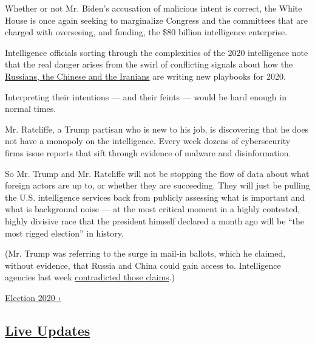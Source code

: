 Whether or not Mr. Biden's accusation of malicious intent is correct,
the White House is once again seeking to marginalize Congress and the
committees that are charged with overseeing, and funding, the \$80
billion intelligence enterprise.

Intelligence officials sorting through the complexities of the 2020
intelligence note that the real danger arises from the swirl of
conflicting signals about how the
\href{https://www.nytimes3xbfgragh.onion/2020/07/24/us/politics/election-interference-russia-china-iran.html?searchResultPosition=8}{Russians,
the Chinese and the Iranians} are writing new playbooks for 2020.

Interpreting their intentions --- and their feints --- would be hard
enough in normal times.

Mr. Ratcliffe, a Trump partisan who is new to his job, is discovering
that he does not have a monopoly on the intelligence. Every week dozens
of cybersecurity firms issue reports that sift through evidence of
malware and disinformation.

So Mr. Trump and Mr. Ratcliffe will not be stopping the flow of data
about what foreign actors are up to, or whether they are succeeding.
They will just be pulling the U.S. intelligence services back from
publicly assessing what is important and what is background noise --- at
the most critical moment in a highly contested, highly divisive race
that the president himself declared a month ago will be ``the most
rigged election'' in history.

(Mr. Trump was referring to the surge in mail-in ballots, which he
claimed, without evidence, that Russia and China could gain access to.
Intelligence agencies last week
\href{https://www.nytimes3xbfgragh.onion/2020/08/26/us/politics/mail-in-voting-foreign-intervention.html}{contradicted
those claims}.)

\href{https://www.nytimes3xbfgragh.onion/news-event/2020-election}{Election
2020 ›}

\hypertarget{live-updates}{%
\subsection{\texorpdfstring{\href{https://www.nytimes3xbfgragh.onion/live/2020/09/09/us/trump-vs-biden}{Live
Updates}}{Live Updates}}\label{live-updates}}

\href{https://www.nytimes3xbfgragh.onion/live/2020/09/09/us/trump-vs-biden\#biden-looks-to-keep-focus-on-trumps-reported-remarks-disparaging-american-soldiers}{}

